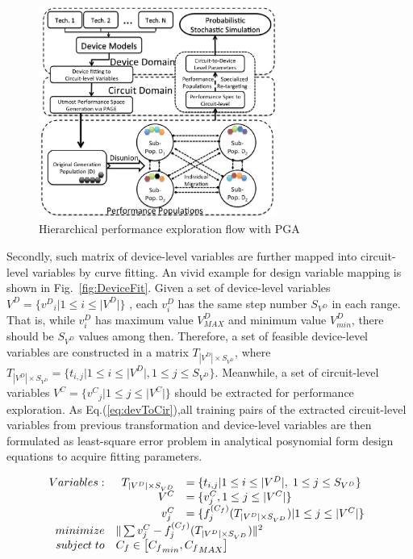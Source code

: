     \begin{figure}[t]
      \centering
      \centerline{
        \includegraphics[width=0.7\textwidth]{Fig/Chapter2/PageFlow.eps}
      }
      \caption{Hierarchical performance exploration flow with PGA} 
      \label{fig:PageFlow}
    \end{figure}

    Secondly, such matrix of device-level variables are further mapped into circuit-level variables by curve fitting. An vivid example for design variable mapping is shown in Fig.~\ref{fig:DeviceFit}. Given a set of device-level variables $V^D= \{{v^D}_i| 1 \leq i \leq |V^D|\}$ , each $v^D_i$ has the same step number $S_{V^D}$ in each range. That is, while $v_i^D$ has maximum value $V^D_{MAX}$ and minimum value $V^D_{min}$, there should be $S_{V^D}$ values among then. Therefore, a set of feasible device-level variables are constructed in a matrix $T_{|V^D|\times S_{V^D}}$, where $T_{|V^D| \times S_{V^D}} = \{ t_{i,j}| 1 \leq i \leq |V^D|, 1 \leq j \leq S_{V^D} \}$. Meanwhile, a set of circuit-level variables $V^C = \{{v^C}_j| 1 \leq j \leq |V^C|\}$ should be extracted for performance exploration. As Eq.(\ref{eq:devToCir}),all training pairs of the extracted circuit-level variables from previous transformation and device-level variables are then formulated as least-square error problem in analytical posynomial form design equations to acquire fitting parameters.

    \begin{align}\label{eq:devToCir}
      \begin{array}[t]{rl}
        Variables: & \begin{array}[t]{rl}
                      T_{|V^D| \times S_{V^D}}  & = \{t_{i,j}| 1 \leq i \leq |V^D|,\; 1 \leq j \leq S_{V^D}\}   \\
                      V^C   &= \{v_j^C, 1\leq j \leq |V^C| \}   \\
                      v_j^C &= \{f_j^{(C_f)}(T_{|V^D| \times S_{V^D}})|1 \leq j \leq |V^C|\}  \\
                    \end{array} \\
         minimize & \| \sum{ v_j^C - f_j^{(C_f)}(T_{|V^D| \times S_{V^D}})}\|^2   \\
       subject\; to & C_f\in \left [{C_f}_{min}, {C_f}_{MAX} \right] 
      \end{array} 
    \end{align}

